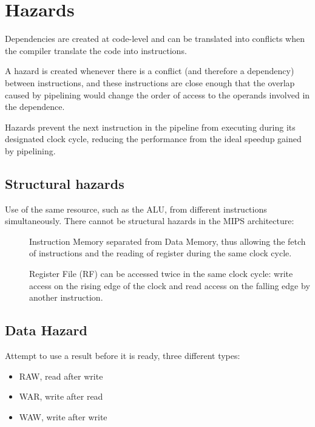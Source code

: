 
\section{Hazards}\label{sec:hazards}
Dependencies are created at code-level and can be translated into conflicts when the compiler translate the code into
instructions.

A hazard is created whenever there is a conflict (and therefore a dependency) between instructions, and
these instructions are close enough that the overlap caused by pipelining would change the order of access to the
operands involved in the dependence.

Hazards prevent the next instruction in the pipeline from executing during its designated clock cycle, reducing the
performance from the ideal speedup gained by pipelining.

\subsection{Structural hazards}\label{subsec:structural-hazards}
Use of the same resource, such as the ALU, from different instructions simultaneously.
There cannot be structural hazards in the MIPS architecture:
\begin{description}
    \item[] Instruction Memory separated from Data Memory, thus allowing the fetch of instructions and the reading of
    register during the same clock cycle.
    \item[] Register File (RF) can be accessed twice in the same clock cycle: write access on the rising edge of
    the clock and read access on the falling edge by another instruction.
\end{description}

\subsection{Data Hazard}\label{subsec:data-hazard}
Attempt to use a result before it is ready, three different types:
\begin{itemize}
    \item[] RAW, read after write
    \item[] WAR, write after read
    \item[] WAW, write after write
\end{itemize}

